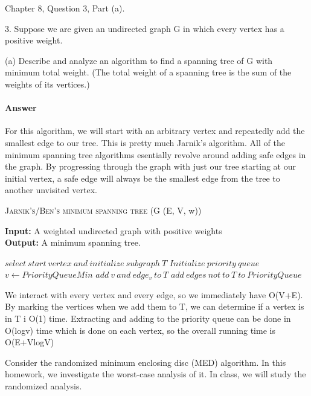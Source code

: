 \documentclass{article}
\begin{document}
\collab{\todo{}}

Chapter 8, Question 3, Part (a).

3. Suppose we are given an undirected graph G in which every vertex has a
positive weight.

(a) Describe and analyze an algorithm to find a spanning tree of G with
minimum total weight. (The total weight of a spanning tree is the sum
of the weights of its vertices.)

\paragraph{Answer}

For this algorithm, we will start with an arbitrary vertex and repeatedly add
the smallest edge to our tree. This is pretty much Jarnik's algorithm. All
of the minimum spanning tree algorithms esentially revolve around adding safe edges
in the graph. By progressing through the graph with just our tree starting at our
initial vertex, a safe edge will always be the smallest edge from the tree to another
unvisited vertex.

\begin{algorithm} \caption{\textsc{Jarnik's/Ben's minimum spanning tree} (G (E, V, w))}\label{alg:seb}
    {\bf Input:} A weighted undirected graph with positive weights\\
    {\bf Output:} A minimum spanning tree.
    \begin{algorithmic}[1]
        \State$select\ start\ vertex\ and\ initialize\ subgraph\ T$
        \State$Initialize\ priority\ queue$
            \State$v \gets PriorityQueueMin$
                \State$add\ v\ and\ edge_v\ to\ T$
                \State$add\ edges\ not\ to\ T\ to\ PriorityQueue$
            \EndIf{}
        \EndFor{}
    \end{algorithmic}
\end{algorithm}

We interact with every vertex and every edge, so we immediately have O(V+E). By
marking the vertices when we add them to T, we can determine if a vertex is in T
i O(1) time. Extracting and adding to the priority queue can be done in O(logv) time
which is done on each vertex, so the overall running time is O(E+VlogV)

\collab{\todo{}}
Consider the randomized minimum enclosing disc (MED) algorithm.  In this
homework, we investigate the worst-case analysis of it.  In class, we will study
the randomized analysis.
\end{document}
